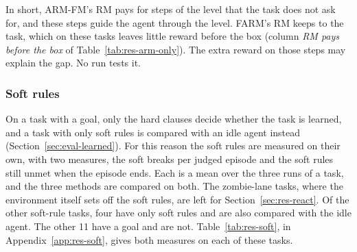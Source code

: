 \documentclass[11pt,english,listoffigures,listoftables]{tfgetsinf}
\begin{document}
In short, ARM-FM's RM pays for steps of the level that the task does not ask for, and these steps guide the agent through the level. FARM's RM keeps to the task, which on these tasks leaves little reward before the box (column \emph{RM pays before the box} of Table~\ref{tab:res-arm-only}). The extra reward on those steps may explain the gap. No run tests it.

\subsubsection{Soft rules}
On a task with a goal, only the hard clauses decide whether the task is learned, and a task with only soft rules is compared with an idle agent instead (Section~\ref{sec:eval-learned}). For this reason the soft rules are measured on their own, with two measures, the soft breaks per judged episode and the soft rules still unmet when the episode ends. Each is a mean over the three runs of a task, and the three methods are compared on both. The zombie-lane tasks, where the environment itself sets off the soft rules, are left for Section~\ref{sec:res-react}. Of the other soft-rule tasks, four have only soft rules and are also compared with the idle agent. The other 11 have a goal and are not. Table~\ref{tab:res-soft}, in Appendix~\ref{app:res-soft}, gives both measures on each of these tasks.
\end{document}
